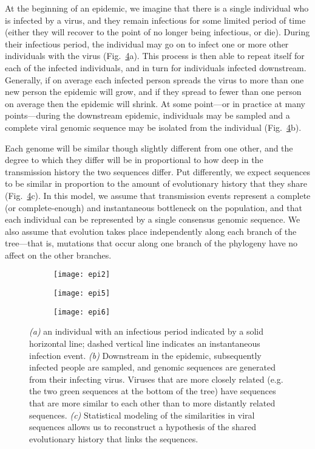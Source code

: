 At the beginning of an epidemic, we imagine that there is a single individual who is infected by a virus, and they remain infectious for some limited period of time (either they will recover to the point of no longer being infectious, or die).
During their infectious period, the individual may go on to infect one or more other individuals with the virus (Fig.~\ref{fig:epiProcess}a).
This process is then able to repeat itself for each of the infected individuals, and in turn for individuals infected downstream.
Generally, if on average each infected person spreads the virus to more than one new person the epidemic will grow, and if they spread to fewer than one person on average then the epidemic will shrink.
At some point---or in practice at many points---during the downstream epidemic, individuals may be sampled and a complete viral genomic sequence may be isolated from the individual (Fig.~\ref{fig:epiProcess}b).

Each genome will be similar though slightly different from one other, and the degree to which they differ will be in proportional to how deep in the transmission history the two sequences differ.
Put differently, we expect sequences to be similar in proportion to the amount of evolutionary history that they share (Fig.~\ref{fig:epiProcess}c).
In this model, we assume that transmission events represent a complete (or complete-enough) and instantaneous bottleneck on the population, and that each individual can be represented by a single consensus genomic sequence.
We also assume that evolution takes place independently along each branch of the tree---that is, mutations that occur along one branch of the phylogeny have no affect on the other branches.

\begin{figure}[ht]
  \centering
  \begin{subfigure}{0.45\textwidth}
    \texttt{[image: epi2]}
    \label{fig:epiProcess1}
    \caption{}
  \end{subfigure}
  \begin{subfigure}{0.45\textwidth}
    \texttt{[image: epi5]}
    \label{fig:epiProcess2}
    \caption{}
  \end{subfigure}
  \begin{subfigure}{0.45\textwidth}
    \texttt{[image: epi6]}
    \label{fig:epiProcess3}
    \caption{}
  \end{subfigure}
  \caption[The epidemic process is inherently treelike]{\textit{(a)} an individual with an infectious period indicated by a solid horizontal line; dashed vertical line indicates an instantaneous infection event. \textit{(b)} Downstream in the epidemic, subsequently infected people are sampled, and genomic sequences are generated from their infecting virus. Viruses that are more closely related (e.g. the two green sequences at the bottom of the tree) have sequences that are more similar to each other than to more distantly related sequences. \textit{(c)} Statistical modeling of the similarities in viral sequences allows us to reconstruct a hypothesis of the shared evolutionary history that links the sequences.}
  \label{fig:epiProcess}
\end{figure}

